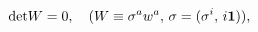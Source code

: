 \begin{equation}
{\rm det}W=0, \quad  (W\equiv\sigma^aw^a,\, \sigma=(\sigma^i,\, i{\mathbf1})), 
\label{quadric}
\end{equation}

